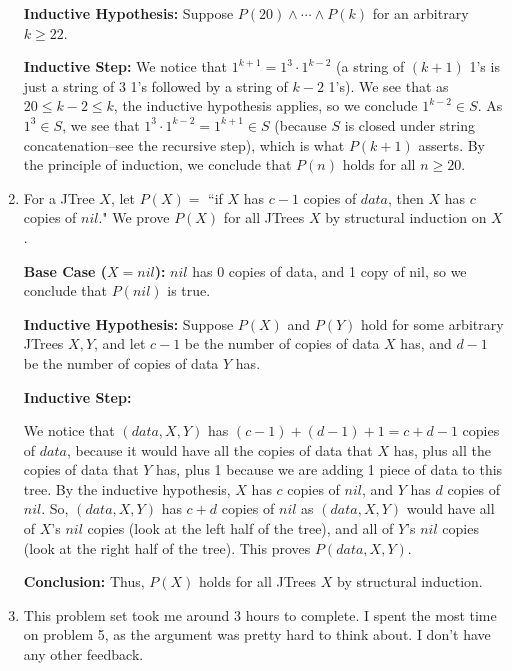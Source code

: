\documentclass[12pt]{article}
\theoremstyle{definition}
\theoremstyle{remark}
\begin{document}
\begin{enumerate}[leftmargin=\labelsep]
		\textbf{Inductive Hypothesis: } Suppose $P(20) \land \cdots \land P(k)$ for an arbitrary $k \geq 22$. 
		
		\textbf{Inductive Step: }
		We notice that $1^{k+1} = 1^3 \cdot 1^{k-2}$ (a string of $(k+1)$ 1's is just a string of 3 1's followed by a string of $k-2$ 1's). We see that as $20 \leq k - 2 \leq k$, the inductive hypothesis applies, so we conclude $1^{k-2} \in S$. As $1^3 \in S$, we see that $1^3 \cdot 1^{k-2} = 1^{k+1} \in S$ (because $S$ is closed under string concatenation--see the recursive step), which is what $P(k+1)$ asserts. By the principle of induction, we conclude that $P(n)$ holds for all $n \geq 20$.
		
		\newpage
		\item For a JTree $X$, let $P(X) = $ ``if $X$ has $c-1$ copies of $data$, then $X$ has $c$ copies of $nil$." We prove $P(X)$ for all JTrees $X$ by structural induction on $X$.
		
		\textbf{Base Case ($X=nil$):} $nil$ has 0 copies of data, and 1 copy of nil, so we conclude that $P(nil)$ is true.
		
		\textbf{Inductive Hypothesis:} Suppose $P(X)$ and $P(Y)$ hold for some arbitrary JTrees $X,Y$, and let $c-1$ be the number of copies of data $X$ has, and $d-1$ be the number of copies of data $Y$ has.
		
		\textbf{Inductive Step:}  
		
		 We notice that $(data, X, Y)$ has $(c-1)+(d-1)+1 = c + d - 1$ copies of $data$, because it would have all the copies of data that $X$ has, plus all the copies of data that $Y$ has, plus 1 because we are adding 1 piece of data to this tree. By the inductive hypothesis, $X$ has $c$ copies of $nil$, and $Y$ has $d$ copies of $nil$. So, $(data, X, Y)$ has $c+d$ copies of $nil$ as $(data, X, Y)$ would have all of $X$'s $nil$ copies (look at the left half of the tree), and all of $Y$'s $nil$ copies (look at the right half of the tree). This proves $P(data, X, Y)$.
		 
		 \textbf{Conclusion:} Thus, $P(X)$ holds for all JTrees $X$ by structural induction.
		 
		 \newpage
		 \item This problem set took me around 3 hours to complete. I spent the most time on problem 5, as the argument was pretty hard to think about. I don't have any other feedback.
	\end{enumerate}
\end{document}
